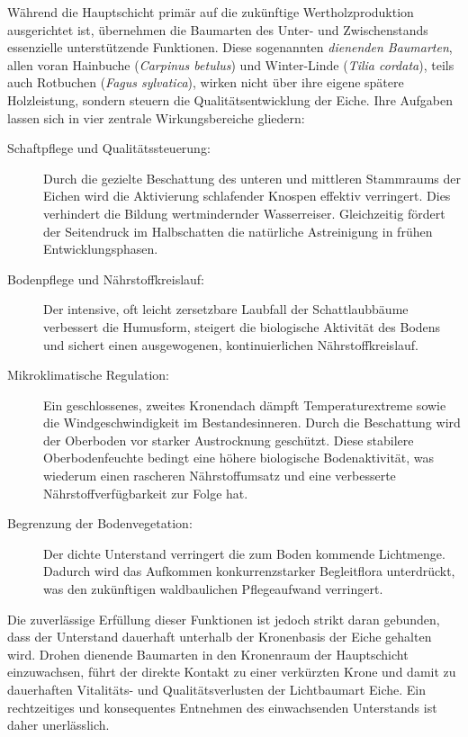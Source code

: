 \documentclass[twocolumn, bibliography=totoc, abstract=true]{scrartcl}
\begin{document}
Während die Hauptschicht primär auf die zukünftige Wertholzproduktion ausgerichtet ist, übernehmen die Baumarten des Unter- und Zwischenstands essenzielle unterstützende Funktionen. Diese sogenannten \emph{dienenden Baumarten}, allen voran Hainbuche (\textit{Carpinus betulus}) und Winter-Linde (\textit{Tilia cordata}), teils auch Rotbuchen (\textit{Fagus sylvatica}), wirken nicht über ihre eigene spätere Holzleistung, sondern steuern die Qualitätsentwicklung der Eiche. Ihre Aufgaben lassen sich in vier zentrale Wirkungsbereiche gliedern:

\begin{description}
\item[Schaftpflege und Qualitätssteuerung:] Durch die gezielte Beschattung des unteren und mittleren Stammraums der Eichen wird die Aktivierung schlafender Knospen effektiv verringert. Dies verhindert die Bildung wertmindernder Wasserreiser. Gleichzeitig fördert der Seitendruck im Halbschatten die natürliche Astreinigung in frühen Entwicklungsphasen.
\item[Bodenpflege und Nährstoffkreislauf:] Der intensive, oft leicht zersetzbare Laubfall der Schattlaubbäume verbessert die Humusform, steigert die biologische Aktivität des Bodens und sichert einen ausgewogenen, kontinuierlichen Nährstoffkreislauf.
\item[Mikroklimatische Regulation:] Ein geschlossenes, zweites Kronendach dämpft Temperaturextreme sowie die Windgeschwindigkeit im Bestandesinneren. Durch die Beschattung wird der Oberboden vor starker Austrocknung geschützt. Diese stabilere Oberbodenfeuchte bedingt eine höhere biologische Bodenaktivität, was wiederum einen rascheren Nährstoffumsatz und eine verbesserte Nährstoffverfügbarkeit zur Folge hat.
\item[Begrenzung der Bodenvegetation:] Der dichte Unterstand verringert die zum Boden kommende Lichtmenge. Dadurch wird das Aufkommen konkurrenzstarker Begleitflora unterdrückt, was den zukünftigen waldbaulichen Pflegeaufwand verringert.
\end{description}

Die zuverlässige Erfüllung dieser Funktionen ist jedoch strikt daran gebunden, dass der Unterstand dauerhaft unterhalb der Kronenbasis der Eiche gehalten wird. Drohen dienende Baumarten in den Kronenraum der Hauptschicht einzuwachsen, führt der direkte Kontakt zu einer verkürzten Krone und damit zu dauerhaften Vitalitäts- und Qualitätsverlusten der Lichtbaumart Eiche. Ein rechtzeitiges und konsequentes Entnehmen des einwachsenden Unterstands ist daher unerlässlich.
\end{document}
